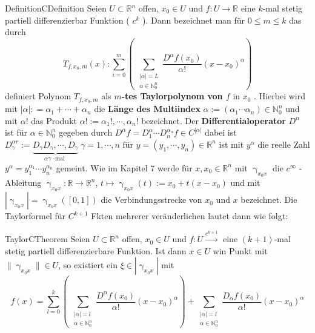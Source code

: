 \begin{ibox}[]{Definition}{CDefinition}
    Seien $ U \subset \mathbb{R}^n  $ offen, $ x_0 \in U $ und $ f: U \to \mathbb{R}  $ eine $ k $-mal stetig partiell differenzierbar
	Funktion ( $ c^{k} $ ). Dann bezeichnet man für $ 0 \leq  m \leq k $ das durch
	$$ T_{f, x_0, m} \left(x\right) : \sum_{i=0}^{m} \left( \, \sum_{ \substack{ |\alpha| = L \\ \alpha \in \mathbb{N}_{0}^{n} }}
	\frac{D^{\alpha }f \left(x_0\right) }{\alpha !} \left( x - x_0 \right) ^{\alpha }\right) $$ 
		definiert Polynom $ T_{f,x_0,m} $ als \textbf{ $ m $-tes Taylorpolynom von $ f \text{ in } x_0 $ }. Hierbei wird mit 
	$ |\alpha| : = \alpha_1 +  \cdots + \alpha_n $ die \textbf{Länge des Multiindex} $ \alpha := \left( \alpha_1  \cdots  \alpha_{n} \right) \in \mathbb{N}_{0}^{n} $ und mit $ \alpha ! $ das Produkt $ \alpha ! := \alpha_1 ! , \cdots,  \alpha_{n} ! $ bezeichnet. Der 
	\textbf{Differentialoperator} $ D^{\alpha } $ ist für $ \alpha  \in \mathbb{N}_{0}^{n} $ gegeben durch $ D^{\alpha }f = 
	D_1^{\alpha } \cdots  D_n^{\alpha_n} f \in C^{|\alpha |}$ dabei ist $ D_{\gamma }^{\alpha r} := \underbrace{ D_{\gamma } 
	D_{\gamma }, \cdots,  D_{\gamma }}_{\alpha \gamma \text{ -mal } } \; \gamma = 1, \cdots,  n \text{ für } y = \left( y_1
, \cdots,  y_n\right) \in \mathbb{R}^n $	ist mit  $ y^{\alpha } $ die reelle Zahl $ y^{\alpha } = y_1^{\alpha_1}
\cdots  y_n^{\alpha_n} $  gemeint. Wie im Kapitel 7 werde für $ x,x_0 \in \mathbb{R}^n  $ mit $ \upgamma_{x_0x} $ die $ c^{ \infty } $
-Ableitung $ \upgamma_{x_0x}: \mathbb{R}  \to \mathbb{R}^n  $, $ t \mapsto \upgamma_{x_0x} \left(t\right) := x_0 + t(x-x_0)$ und mit
$  \left| \upgamma_{x_0x} \right| = \upgamma_{x_0x} \left( \left[ 0,1 \right]  \right)  $ die Verbindungsstrecke von $ x_0 \text{ und }
x $ bezeichnet. Die Taylorformel für $ C^{k+1} $ Fkten mehrerer veränderlichen lautet dann wie folgt:
\end{ibox}
\begin{ibox}[40]{Taylor}{CTheorem}
	Seien $ U \subset \mathbb{R}^n  $ offen, $ x_0 \in U $ und $ f:U \xrightarrow{c^{k+1}}$ eine $ (k+1) $-mal stetig 
	partiell differenzierbare Funktion. Ist dann $ x \in  U $ win Punkt mit $ \| \upgamma_{x_0x} \| \in U $, so existiert ein 
	$ \xi \in \left| \upgamma_{x_0x} \right|  $ mit 
	$$ f \left(x\right) = \sum_{l=0}^{k} \left( \, \sum_{ \substack{ |\alpha | = l \\ \alpha \in \mathbb{N}_{0}^{n} }} 
	\frac{D^{\alpha }f \left(x_0\right) }{\alpha !} \left( x - x_0 \right) ^{\alpha } \right) + \sum_{ \substack{ |\alpha | = l \\ 
\alpha  \in  \mathbb{N}_{0}^{n}}} \frac{D_{\alpha }f \left(x_0\right) }{\alpha !} \left( x-x_0 \right) ^{\alpha } $$
\end{ibox}
 
